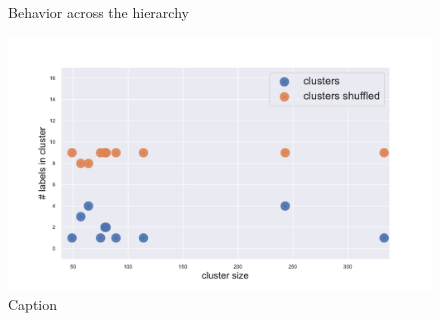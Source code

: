 \begin{figure}[htb!]
\begin{minipage}{0.45\textwidth}
    \end{minipage}
    \caption{Behavior across the hierarchy}
    \label{fig:topic/gtex/oversigma_10tissue/shuffledcluster_maximum*}
\end{figure}

\begin{figure}[htb!]
    \centering
    \includegraphics[width=0.9\linewidth]{pictures/topic/gtex/oversigma_10tissue/shuffledcluster_shuffle_label_size_l3_primary_site.pdf}
    \caption{Caption}
    \label{fig:topic/gtex/oversigma_10tissue/shuffledcluster_shuffle_label_size_l3_primary_site}
\end{figure}


